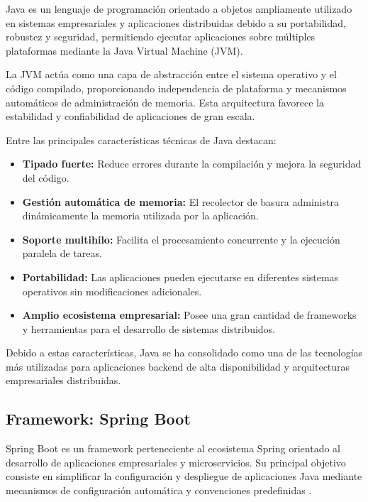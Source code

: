 Java es un lenguaje de programación orientado a objetos ampliamente utilizado en sistemas empresariales y aplicaciones distribuidas debido a su portabilidad, robustez y seguridad, permitiendo ejecutar aplicaciones sobre múltiples plataformas mediante la Java Virtual Machine (JVM).

La JVM actúa como una capa de abstracción entre el sistema operativo y el código compilado, proporcionando independencia de plataforma y mecanismos automáticos de administración de memoria. Esta arquitectura favorece la estabilidad y confiabilidad de aplicaciones de gran escala.

Entre las principales características técnicas de Java destacan:

\begin{itemize}
\item \textbf{Tipado fuerte:} Reduce errores durante la compilación y mejora la seguridad del código.

\item \textbf{Gestión automática de memoria:} El recolector de basura administra dinámicamente la memoria utilizada por la aplicación.

\item \textbf{Soporte multihilo:} Facilita el procesamiento concurrente y la ejecución paralela de tareas.

\item \textbf{Portabilidad:} Las aplicaciones pueden ejecutarse en diferentes sistemas operativos sin modificaciones adicionales.

\item \textbf{Amplio ecosistema empresarial:} Posee una gran cantidad de frameworks y herramientas para el desarrollo de sistemas distribuidos.
\end{itemize}

Debido a estas características, Java se ha consolidado como una de las tecnologías más utilizadas para aplicaciones backend de alta disponibilidad y arquitecturas empresariales distribuidas.

\subsection{Framework: Spring Boot}

Spring Boot es un framework perteneciente al ecosistema Spring orientado al desarrollo de aplicaciones empresariales y microservicios. Su principal objetivo consiste en simplificar la configuración y despliegue de aplicaciones Java mediante mecanismos de configuración automática y convenciones predefinidas \cite{38}.

